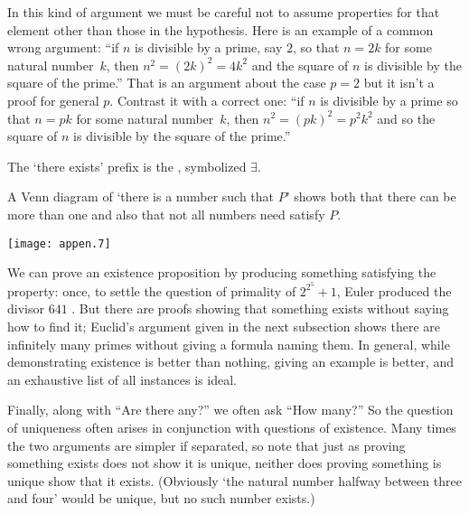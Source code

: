 In this kind of argument we must be careful not to assume 
properties for that element
other than those in the hypothesis.
Here is an example of a common wrong argument:
``if \( n \) is divisible by a prime, say \( 2 \), so that \( n=2k \)
for some natural number~$k$,
then \( n^2=(2k)^2=4k^2 \) and the square of $n$ is divisible
by the square of the prime.''
That is an argument about the case \( p=2 \) but it isn't a proof for
general \( p \).
Contrast it with a correct one:
``if \( n \) is divisible by a prime
so that \( n=pk \) for some natural number~$k$,
then \( n^2=(pk)^2=p^2k^2 \) and so the square of $n$ is divisible
by the square of the prime.''




The `there exists' prefix is the 
,
symbolized 
\( \exists \).


A Venn diagram 
of `there is a number such that \( P \)' shows both that there can be
more than one and also that not all numbers need satisfy \( P \).
\begin{center}
  \texttt{[image: appen.7]}
\end{center}

We can prove
an existence proposition by producing something satisfying
the property: once, to settle the question of primality of
\( 2^{2^5}+1 \), Euler produced the divisor \( 641 \) \cite{Sandifer}.
But there are proofs
showing that something exists without saying how to find it;
Euclid's argument given in the next subsection
shows there are infinitely many primes without giving a formula naming them.
In general, while demonstrating existence is better than nothing,
giving an example is better, and an
exhaustive list of all instances is ideal.

Finally,
along with ``Are there any?'' %
we often ask ``How many?''
So the question of uniqueness often arises in conjunction
with questions of existence.
Many times the two arguments are simpler if separated, so note that just as
proving something exists does not show it is unique,
neither does proving something is unique show that it exists.
(Obviously `the natural number halfway between three and four' 
would be unique, but no such number exists.)










